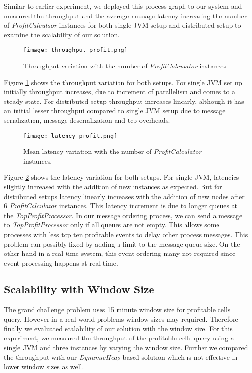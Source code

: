 Similar to earlier experiment,  we deployed this process graph to our system and measured the throughput and the average message latency increasing the number of  \textit{ProfitCalculaor} instances for both single JVM setup and distributed setup to examine the scalability of our solution.

\begin{figure}[!t]
        \centering
        \texttt{[image: throughput\_profit.png]}
        \caption{Throughput variation with the number of \textit{ProfitCalculator} instances.}
        \label{throughput_profit}
\end{figure}
 
Figure \ref{throughput_profit} shows the throughput variation for both setups. For single JVM set up initially throughput increases, due to increment of parallelism and comes to a steady state. For distributed setup  throughput increases linearly, although it has an initial lesser throughput compared to single JVM setup due to message serialization, message deserialization and tcp overheads. 

\begin{figure}[!t]
        \centering
        \texttt{[image: latency\_profit.png]}
        \caption{Mean latency variation with the number of \textit{ProfitCalculator} instances.}
        \label{latency_profit}
\end{figure}

Figure \ref{latency_profit} shows the latency variation for both setups. For single JVM, latencies slightly increased with the addition of new instances as expected. But for distributed setups latency linearly increases with the addition of new nodes after 6 \textit{ProfitCalculator} instances. This latency increment is due to longer queues at the \textit{TopProfitProcessor}. In our message ordering process, we can send a message to \textit{TopProfitProcessor} only if all queues are not empty. This allows some processes with less top ten profitable events to delay other process messages. This problem can  possibly fixed by adding a limit to the message queue size. On the other hand in a real time system, this event ordering many not required since event processing happens at real time.

\subsection{Scalability with Window Size}

The grand challenge problem uses 15 minute window size for profitable cells query. However in a real world problems window sizes may required. Therefore finally we evaluated scalability of our solution with the window size.  For this experiment, we measured the throughput of the profitable cells query using a single JVM and three instances by varying the window size. Further we compared the throughput with our \textit{DynamicHeap} based solution which is not effective in lower window sizes as well.

